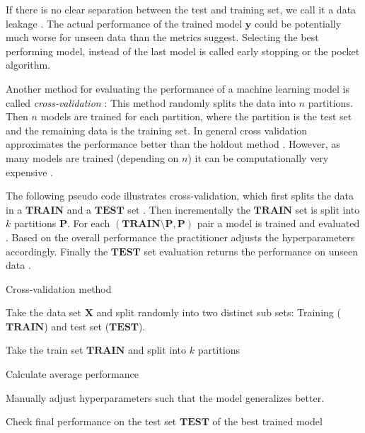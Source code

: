 \documentclass[draft,final,oneside]{vutinfth} %
\begin{document}
If there is no clear separation between the test and training set, we call it a data leakage \cite{doingdatascience}. The actual performance of the trained model $\boldsymbol{y}$ could be potentially much worse for unseen data than the metrics suggest. Selecting the best performing model, instead of the last model is called early stopping or the pocket algorithm.

Another method for evaluating the performance of a machine learning model is called \textit{cross-validation} \cite{holdoutcrossvalidation}: This method randomly splits the data into $n$ partitions. Then $n$ models are trained for each partition, where the partition is the test set and the remaining data is the training set. In general cross validation approximates the performance better than the holdout method \cite{aimodern}. However, as many models are trained (depending on $n$) it can be computationally very expensive  \cite{bishop}.

The following pseudo code illustrates cross-validation, which first splits the data in a $\boldsymbol{TRAIN}$ and a $\boldsymbol{TEST}$ set \cite{holdoutcrossvalidation}. Then incrementally the $\boldsymbol{TRAIN}$ set is split into $k$ partitions $\boldsymbol{P}$. For each $(\boldsymbol{TRAIN} \setminus \boldsymbol{P}, \boldsymbol{P})$ pair a model is trained and evaluated \cite{bishop}. Based on the overall performance the practitioner adjusts the hyperparameters accordingly. Finally the $\boldsymbol{TEST}$ set evaluation returns the performance on unseen data \cite{holdoutcrossvalidation}.

\begin{algorithm}
\caption{Cross-validation method \cite{holdoutcrossvalidation}}\label{holdoutalgo}
Take the data set $\boldsymbol{X}$ and split randomly into two distinct sub sets: Training ($\boldsymbol{TRAIN}$) and test set ($\boldsymbol{TEST}$).

 {
Take the train set $\boldsymbol{TRAIN}$ and split into $k$ partitions


Calculate average performance

Manually adjust hyperparameters such that the model generalizes better.
}

Check final performance on the test set $\boldsymbol{TEST}$ of the best trained model

\end{algorithm}
\end{document}
